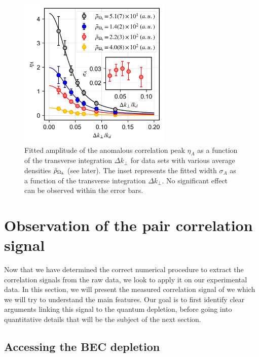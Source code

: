 \begin{figure}
    \centering
    \includegraphics[width=0.65\textwidth]{Fig/Chapter4/eta_vs_int_kmk.png}
    \caption[Fitted amplitude of the anomalous correlation peak $\eta_A$ as a function of the transverse integration $\Delta k_{\perp}$]{Fitted amplitude of the anomalous correlation peak $\eta_A$ as a function of the transverse integration $\Delta k_{\perp}$ for data sets with various average densities $\bar{\rho}_{\Omega_k}$ (see later). The inset represents the fitted width $\sigma_A$ as a function of the transverse integration $\Delta k_{\perp}$. No significant effect can be observed within the error bars.}
    \label{fig:eta_vs_int_kmk}
\end{figure}


\section{Observation of the pair correlation signal}

Now that we have determined the correct numerical procedure to extract the correlation signals from the raw data, we look to apply it on our experimental data. In this section, we will present the measured \kmk correlation signal of we which we will try to understand the main features. Our goal is to first identify clear arguments linking this signal to the quantum depletion, before going into quantitative details that will be the subject of the next section.

\subsection{Accessing the BEC depletion}
\label{sec:accessing_depletion}

